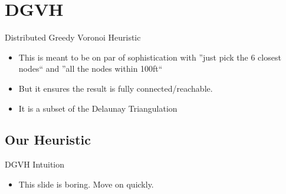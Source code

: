 \documentclass[8pt]{beamer}
\begin{document}
	

	
\section{DGVH}
	\begin{frame}{Distributed Greedy Voronoi Heuristic}
		\begin{itemize}
			\item This is meant to be on par of sophistication with ''just pick the 6 closest nodes`` and ''all the nodes within 100ft``
			\item But it ensures the result is fully connected/reachable.
			\item It is a subset of the Delaunay Triangulation
		\end{itemize}
		
	\end{frame}
	
	\subsection{Our Heuristic}

	\begin{frame}{DGVH Intuition}

		\begin{itemize}
			\item This slide is boring. Move on quickly.
		\end{itemize}

	\end{frame}
	
\end{document}
